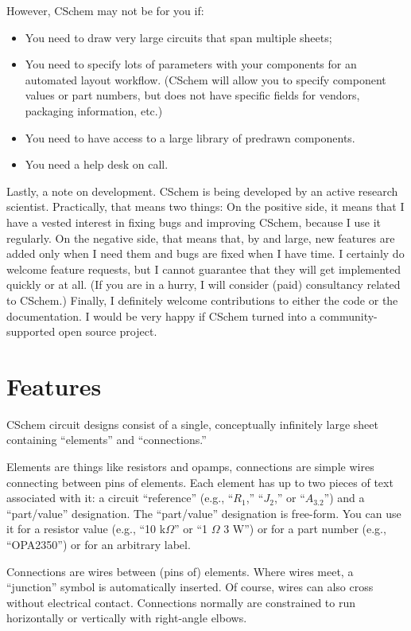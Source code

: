 \documentclass[11pt]{report}
\def\Ohm{$\Omega$}
\begin{document}
\noindent However, CSchem may not be for you if:
\begin{itemize}
  \item You need to draw very large circuits that span multiple
    sheets;
  \item You need to specify lots of parameters with your components
    for an automated layout workflow. (CSchem will allow you to
    specify component values or part numbers, but does not have
    specific fields for vendors, packaging information, etc.)
  \item You need to have access to a large library of predrawn components.
  \item You need a help desk on call.
\end{itemize}
\noindent Lastly, a note on development. CSchem is being developed by an
active research scientist. Practically, that means two things: On the
positive side, it means that I have a vested interest in fixing bugs
and improving CSchem, because I use it regularly. On the negative side, that
means that, by and large, new features are added only when I need them
and bugs are fixed when I have time. I certainly do welcome feature
requests, but I cannot guarantee that they will get implemented
quickly or at all. (If you are in a hurry, I will consider (paid)
consultancy related to CSchem.) Finally, I definitely welcome
contributions to either the code or the documentation. I would be very
happy if CSchem turned into a community-supported open source project.

\section{Features}

CSchem circuit designs consist of a single, conceptually infinitely
large sheet containing ``elements'' and ``connections.''

Elements are things like resistors and opamps, connections are simple
wires connecting between pins of elements. Each element has up to two
pieces of text associated with it: a circuit ``reference'' (e.g.,
``$R_1$,'' ``$J_2$,'' or ``$A_{3.2}$'') and a ``part/value''
designation. The ``part/value'' designation is free-form. You can use
it for a resistor value (e.g., ``10 k\Ohm'' or ``1 \Ohm{} 3 W'') or
for a part number (e.g., ``OPA2350'') or for an arbitrary
label.

Connections are wires between (pins of) elements. Where wires meet, a
``junction'' symbol is automatically inserted. Of course, wires can
also cross without electrical contact. Connections normally are
constrained to run horizontally or vertically with right-angle elbows.
\end{document}

